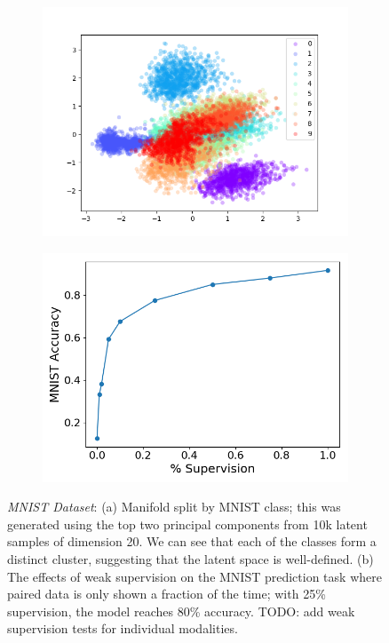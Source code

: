 \documentclass{article}
\begin{document}
\begin{figure}[!h]
\centering
    \begin{subfigure}[b]{.32\linewidth}
        \centering
        \includegraphics[width=\linewidth]{mnist_mmvae_pca_manifold.png}
        \caption{}
    \end{subfigure}
    \begin{subfigure}[b]{.32\linewidth}
        \centering
        \includegraphics[width=\linewidth]{mnist_mmvae_joint_weak_supervision.png}
        \caption{}
    \end{subfigure}
    \caption{\emph{MNIST Dataset}: (a) Manifold split by MNIST class; this was generated using the top two principal components from 10k latent samples of dimension 20. We can see that each of the classes form a distinct cluster, suggesting that the latent space is well-defined. (b) The effects of weak supervision on the MNIST prediction task where paired data is only shown a fraction of the time; with 25\% supervision, the model reaches 80\% accuracy. TODO: add weak supervision tests for individual modalities.}
    \label{fig:mnist:weaksupervision}
\end{figure}
\end{document}
